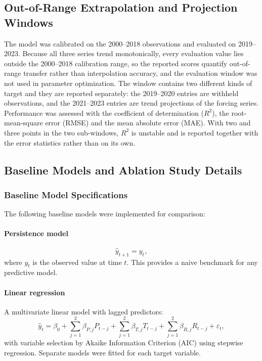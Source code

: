 \documentclass[12pt,a4paper]{article}
\begin{document}
	\subsection{Out-of-Range Extrapolation and Projection Windows}

The model was calibrated on the 2000--2018 observations and evaluated on 2019--2023. Because all three series trend monotonically, every evaluation value lies outside the 2000--2018 calibration range, so the reported scores quantify out-of-range transfer rather than interpolation accuracy, and the evaluation window was not used in parameter optimization. The window contains two different kinds of target and they are reported separately: the 2019--2020 entries are withheld observations, and the 2021--2023 entries are trend projections of the forcing series. Performance was assessed with the coefficient of determination ($R^2$), the root-mean-square error (RMSE) and the mean absolute error (MAE). With two and three points in the two sub-windows, $R^2$ is unstable and is reported together with the error statistics rather than on its own.
	\subsection{Baseline Models and Ablation Study Details}
	\label{sec:s2_baseline}
	
	\subsubsection{Baseline Model Specifications}
	
	The following baseline models were implemented for comparison:
	
	\paragraph{Persistence model}
	\begin{equation}
		\hat{y}_{t+1} = y_t,
	\end{equation}
	where $y_t$ is the observed value at time $t$. This provides a naive benchmark for any predictive model.
	
	\paragraph{Linear regression}
	A multivariate linear model with lagged predictors:
	\begin{equation}
		\hat{y}_t = \beta_0 + \sum_{j=1}^{2} \beta_{P,j} P_{t-j} + \sum_{j=1}^{2} \beta_{T,j} T_{t-j} + \sum_{j=1}^{2} \beta_{R,j} R_{t-j} + \varepsilon_t,
	\end{equation}
	with variable selection by Akaike Information Criterion (AIC) using stepwise regression. Separate models were fitted for each target variable.
	
\end{document}
